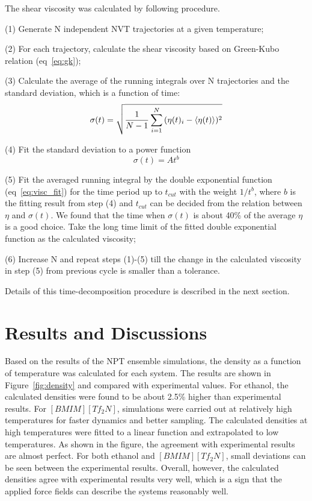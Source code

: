 \documentclass[12pt]{article}
\begin{document}
The shear viscosity was calculated by following procedure.

(1) Generate N independent NVT trajectories at a given temperature;

(2) For each trajectory, calculate the shear viscosity based on Green-Kubo relation (eq~\ref{eq:gk});

(3) Calculate the average of the running integrals over N trajectories and the standard deviation,
which is a function of time:
\begin{equation}
{\sigma(t) = \sqrt{ {1 \over {N-1}} \sum_{i=1}^{N} {(\eta(t)_i - \langle \eta(t) \rangle)^2} } }
\label{eq:std_err}
\end{equation}

(4) Fit the standard deviation to a power function
\begin{equation}
{\sigma(t)=At^b}
\label{eq:power}
\end{equation}

(5) Fit the averaged running integral by the double exponential function (eq~\ref{eq:visc_fit}) 
for the time period up to $t_{cut}$ with the weight $1/t^b$,
where $b$ is the fitting result from step (4) and $t_{cut}$ can be decided from the relation between $\eta$ and $\sigma(t)$.
We found that the time when $\sigma(t)$ is about 40\% of the average $\eta$ is a good choice. 
Take the long time limit of the fitted double exponential function as the calculated viscosity;

(6) Increase N and repeat steps (1)-(5) till the change in the calculated viscosity in step (5) from previous cycle is smaller than a tolerance.

Details of this time-decomposition procedure is described in the next section.



\section{Results and Discussions}

Based on the results of the NPT ensemble simulations,
the density as a function of temperature was calculated for each system.
The results are shown in Figure~\ref{fig:density} and compared with experimental values.
For ethanol, the calculated densities were found to be about 2.5\% higher than experimental results.
For $[BMIM][Tf_2N]$, 
simulations were carried out at relatively high temperatures for faster dynamics and better sampling.
The calculated densities at high temperatures were fitted to a linear function and extrapolated to low temperatures.
As shown in the figure, 
the agreement with experimental results are almost perfect.
For both ethanol and $[BMIM][Tf_2N]$, 
small deviations can be seen between the experimental results.
Overall, however,
the calculated densities agree with experimental results very well,
which is a sign that the applied force fields can describe the systems reasonably well.
\end{document}
